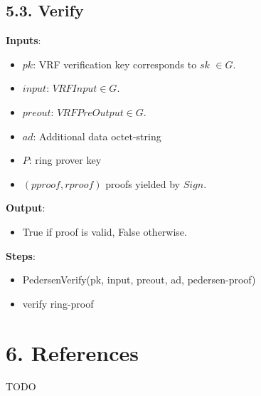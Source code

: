 \documentclass[
]{article}
\providecommand{\tightlist}{%
  \setlength{\itemsep}{0pt}\setlength{\parskip}{0pt}}
\begin{document}
\hypertarget{verify-2}{%
\subsection{5.3. Verify}\label{verify-2}}

\textbf{Inputs}:

\begin{itemize}
\tightlist
\item
  \(pk\): VRF verification key corresponds to \(sk\) \(\in G\).
\item
  \(input\): \(VRFInput \in G\).
\item
  \(preout\): \(VRFPreOutput \in G\).
\item
  \(ad\): Additional data octet-string
\item
  \(P\): ring prover key
\item
  \((pproof, rproof)\) proofs yielded by \(Sign\).
\end{itemize}

\textbf{Output}:

\begin{itemize}
\tightlist
\item
  True if proof is valid, False otherwise.
\end{itemize}

\textbf{Steps}:

\begin{itemize}
\tightlist
\item
  PedersenVerify(pk, input, preout, ad, pedersen-proof)
\item
  verify ring-proof
\end{itemize}

\hypertarget{references}{%
\section{6. References}\label{references}}

TODO
\end{document}
